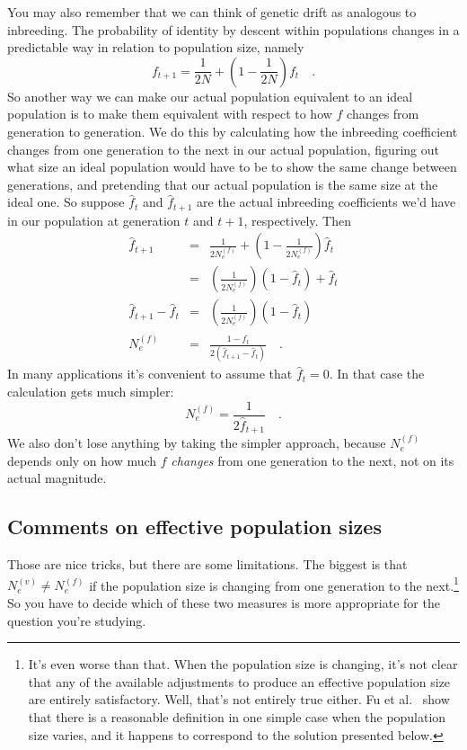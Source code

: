 \documentclass[12pt]{article}
\begin{document}
You may also remember that we can think of genetic drift as analogous
to inbreeding. The probability of identity by descent within
populations changes in a predictable way in relation to population
size, namely
\[
f_{t+1}
   = \frac{1}{2N} + \left(1 - \frac{1}{2N}\right)f_t \quad.
\]
So another way we can make our actual population equivalent to an
ideal population is to make them equivalent with respect to how $f$
changes from generation to generation. We do this by calculating how
the inbreeding coefficient changes from one generation to the next in
our actual population, figuring out what size an ideal population
would have to be to show the same change between generations, and
pretending that our actual population is the same size at the ideal
one. So suppose $\hat f_t$ and $\hat f_{t+1}$ are the actual
inbreeding coefficients we'd have in our population at generation $t$
and $t+1$, respectively. Then
\begin{eqnarray*}
\hat f_{t+1} &=& \frac{1}{2N_e^{(f)}} + \left(1 -
        \frac{1}{2N_e^{(f)}}\right)\hat f_t \\
        &=& \left(\frac{1}{2N_e^{(f)}}\right)(1 - \hat f_t) + \hat f_t \\
\hat f_{t+1} - \hat f_t &=& \left(\frac{1}{2N_e^{(f)}}\right)(1 - \hat
        f_t) \\
N_e^{(f)} &=& \frac{1 - \hat f_t}{2(\hat f_{t+1} - \hat f_t)} \quad .
\end{eqnarray*}
In many applications it's convenient to assume that $\hat f_t = 0$. In
that case the calculation gets much simpler:
\[
N_e^{(f)} = \frac{1}{2\hat f_{t+1}} \quad .
\]
We also don't lose anything by taking the simpler approach, because
$N_e^{(f)}$ depends only on how much $f$ {\it changes\/} from one
generation to the next, not on its actual magnitude.

\subsection*{Comments on effective population sizes}

Those are nice tricks, but there are some limitations. The biggest is
that $N_e^{(v)} \ne N_e^{(f)}$ if the population size is changing from
one generation to the next.\footnote{It's even worse than that. When
  the population size is changing, it's not clear that any of the
  available adjustments to produce an effective population size are
  entirely satisfactory. Well, that's not entirely true either. Fu et
  al.~\cite{Fu-etal-2003} show that there is a reasonable definition
  in one simple case when the population size varies, and it happens
  to correspond to the solution presented below.} So you have to
decide which of these two measures is more appropriate for the
question you're studying.
\end{document}

